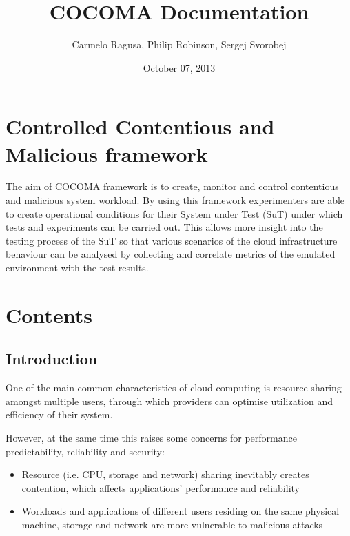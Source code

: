 \documentclass[letterpaper,10pt,english]{sphinxhowto}
\title{COCOMA Documentation}
\date{October 07, 2013}
\author{Carmelo Ragusa, Philip Robinson, Sergej Svorobej}
\begin{document}
\maketitle
\tableofcontents
{}\label{index::doc}



\section{Controlled Contentious and Malicious framework}
\label{index:controlled-contentious-and-malicious-framework}\label{index:cocoma}
The aim of COCOMA framework is to create, monitor and control contentious and malicious system workload. By using this framework experimenters are able to create operational conditions for their System under Test (SuT) under which tests and experiments can be carried out. This allows more insight into the testing process of the SuT so that various scenarios of the cloud infrastructure behaviour can be analysed by collecting and correlate metrics of the emulated environment with the test results.



\section{Contents}
\label{index:contents}

\subsection{Introduction}
\label{COCOMA/01_introduction:introduction}\label{COCOMA/01_introduction::doc}
One of the main common characteristics of cloud computing is resource sharing amongst multiple users, through which providers can optimise utilization and efficiency of their system.

However, at the same time this raises some concerns for performance predictability, reliability and security:
\begin{itemize}
\item {} 
Resource (i.e. CPU, storage and network) sharing inevitably creates contention, which affects applications' performance and reliability

\item {} 
Workloads and applications of different users residing on the same physical machine, storage and network are more vulnerable to malicious attacks

\end{itemize}
\end{document}
